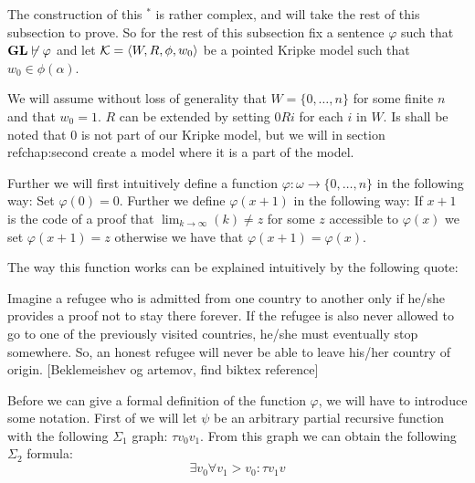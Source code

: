 \documentclass[../main.tex]{subfiles}
\begin{document}
The construction of this
$^*$ is rather complex, and will take the rest of this subsection to prove. So for the
rest of this subsection fix a sentence $\varphi$ such that $\text{\textbf{GL}}\not\vdash \varphi$
and let $\mathcal{K}=\langle W,R,\phi,w_0\rangle$ be a pointed Kripke model such that $w_0\in\phi(\alpha)$.

We will assume without loss of generality  that $W=\{0,\ldots, n\}$ for some finite $n$ and that $w_0=1$.
$R$ can be extended by setting $0Ri$ for each $i$ in $W$. Is shall be noted
that $0$ is not part of our Kripke model, but we will in section
ref{chap:second} create a model where it is a part of the model.

Further we will first intuitively define a function $\varphi:\omega\rightarrow\{0,\ldots, n\}$ in the
following way: Set $\varphi(0)=0$. Further we define $\varphi(x+1)$ in the following way:
If $x+1$ is the code of a proof that $\lim_{k\rightarrow\infty}(k)\not =z$ for
some $z$ accessible to $\varphi(x)$ we set $\varphi(x+1)=z$ otherwise we have that
$\varphi(x+1)=\varphi(x)$.

The way this function works can be explained intuitively by the following
quote:
\begin{displayquote}
	Imagine a refugee who is admitted from one country to another only if
	he/she provides a proof not to stay there forever. If the refugee is
	also never allowed to go to one of the previously visited countries,
	he/she must eventually stop somewhere. So, an honest refugee will never
	be able to leave his/her country of origin. [Beklemeishev og artemov,
	find biktex reference]
\end{displayquote}

Before we can give a formal definition of the function $\varphi$, we will have to
introduce some notation. First of we will let $\psi$ be an arbitrary  partial
recursive function with the following $\Sigma_1$ graph: $\tau v_0v_1$. From
this graph we can obtain the following $\Sigma_2$ formula:
$$\exists v_0\forall v_1>v_0:\tau v_1v$$
\end{document}
